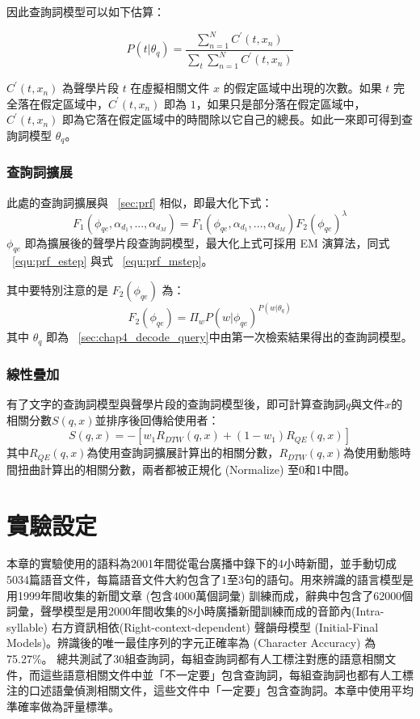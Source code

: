 因此查詢詞模型可以如下估算：

\[
P(t|\theta_q) = \frac{\sum_{n=1}^{N} C^{'}(t, x_n)}{\sum_t \sum_{n=1}^{N} C^{'}(t, x_n)}
\]

$C^{'}(t, x_n)$ 為聲學片段 $t$ 在虛擬相關文件 $x$ 的假定區域中出現的次數。如果 $t$ 完全落在假定區域中，$C^{'}(t, x_n)$ 即為 $1$，如果只是部分落在假定區域中，$C^{'}(t, x_n)$ 即為它落在假定區域中的時間除以它自己的總長。如此一來即可得到查詢詞模型 $\theta_q$。

\subsubsection{查詢詞擴展}
此處的查詢詞擴展與 ~\ref{sec:prf} 相似，即最大化下式：
\begin{equation}
\label{equ:chap4_qe}
F_1(\phi_{qe}, \alpha_{d_1}, ..., \alpha_{d_M}) = F_1(\phi_{qe}, \alpha_{d_1}, ..., \alpha_{d_M}) F_2(\phi_{qe})^\lambda
\end{equation}
$\phi_{qe}$ 即為擴展後的聲學片段查詢詞模型，最大化上式可採用 EM 演算法，同式 ~\ref{equ:prf_estep} 與式 ~\ref{equ:prf_mstep}。

其中要特別注意的是 $F_2(\phi_{qe})$ 為：
\begin{equation}
F_2(\phi_{qe}) = \Pi_w P(w|\phi_{qe})^{P(w|\theta_q)}
\end{equation}
其中 $\theta_q$ 即為 ~\ref{sec:chap4_decode_query}中由第一次檢索結果得出的查詢詞模型。

\subsubsection{線性疊加}
有了文字的查詢詞模型與聲學片段的查詢詞模型後，即可計算查詢詞$q$與文件$x$的相關分數$S(q, x)$並排序後回傳給使用者：
\begin{equation}
\label{equ:chap4_prf_in}
S(q, x) = -[w_1 R_{DTW} (q, x) + (1-w_1) R_{QE} (q, x)]
\end{equation}
其中$R_{QE} (q, x)$為使用查詢詞擴展計算出的相關分數，$R_{DTW} (q, x)$為使用動態時間扭曲計算出的相關分數，兩者都被正規化 (Normalize) 至0和1中間。

\section{實驗設定}
\label{sec:chap4_exp_setup}
本章的實驗使用的語料為2001年間從電台廣播中錄下的4小時新聞，並手動切成5034篇語音文件，每篇語音文件大約包含了$1至3$句的語句。用來辨識的語言模型是用1999年間收集的新聞文章 (包含4000萬個詞彙) 訓練而成，辭典中包含了62000個詞彙，聲學模型是用2000年間收集的8小時廣播新聞訓練而成的音節內(Intra-syllable) 右方資訊相依(Right-context-dependent) 聲韻母模型 (Initial-Final Models)。辨識後的唯一最佳序列的字元正確率為 (Character Accuracy) 為75.27\%。
總共測試了30組查詢詞，每組查詢詞都有人工標注對應的語意相關文件，而這些語意相關文件中並「不一定要」包含查詢詞，每組查詢詞也都有人工標注的口述語彙偵測相關文件，這些文件中「一定要」包含查詢詞。本章中使用平均準確率做為評量標準。

